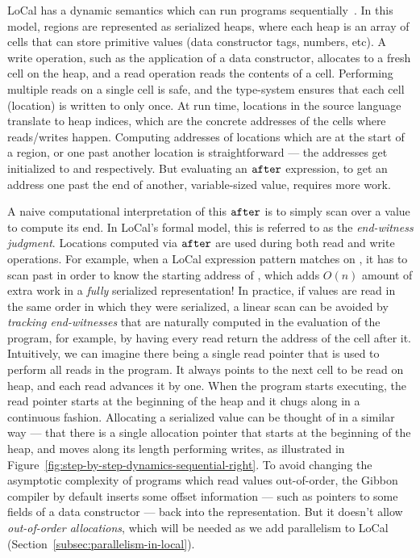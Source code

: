 \documentclass[acmsmall,acmthm=false,nonacm]{acmart}
\theoremstyle{straighttext0}
\theoremstyle{straighttext}
\newcommand{\Secref}[1]{Section~\ref{#1}}
\newcommand{\Figref}[1]{Figure~\ref{#1}}
\begin{document}
LoCal has a dynamic semantics which can run programs sequentially~\cite{LoCal}.
In this model, regions are represented as serialized heaps, where each heap
is an array of cells that can store primitive values
(data constructor tags, numbers, etc).
%
A write operation, such as the application of a data constructor, allocates to a fresh cell
on the heap, and a read operation reads the contents of a cell.
Performing multiple reads on a single cell is safe, and the type-system ensures
that each cell (location) is written to only once.
%
At run time, locations in the source language translate to heap indices,
which are the concrete addresses of the cells where reads/writes happen.
%
Computing addresses of locations which are at the start of a region,
or one past another location is straightforward
--- the addresses get initialized to  and  respectively.
%
But evaluating an $\texttt{after}$ expression,
to get an address one past the end of another, variable-sized value,
requires more work.

A naive computational interpretation of this $\texttt{after}$ is to simply scan over
a value to compute its end.
%
In LoCal's formal model, this is referred to as the {\em end-witness judgment}.
%
Locations computed via $\texttt{after}$ are used during both read and write operations.
%
For example,
when a LoCal  expression pattern matches on ,
it has to scan past  in order to know the starting address of ,
which adds $O(n)$ amount of extra work in a {\em fully} serialized representation!
%
In practice, if values are read in the same order in which they were serialized,
a linear scan can be avoided by {\em tracking end-witnesses} that are
naturally computed in the evaluation of the program,
for example, by having every read return the address of the cell after it.
%
Intuitively, we can imagine there being a single read pointer that
is used to perform all reads in the program.
%
It always points to the next cell to be read on heap, and each read
advances it by one.
%
When the program starts executing, the read pointer starts at the
beginning of the heap and it chugs along in a continuous fashion.
%
Allocating a serialized value can  be thought of in a similar way ---
that there is a single allocation pointer that starts at the
beginning of the heap, and moves along its length performing writes,
as illustrated in \Figref{fig:step-by-step-dynamics-sequential-right}.
%
To avoid changing the asymptotic complexity of programs which read values out-of-order,
the Gibbon compiler by default inserts some offset information ---
such as pointers to some fields of a data constructor ---  back into the representation.  
%
But it doesn't allow {\em out-of-order allocations},
which will be needed as we add parallelism to LoCal (\Secref{subsec:parallelism-in-local}).
\end{document}
